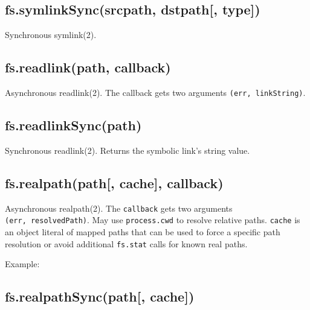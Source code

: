 \subsection{fs.symlinkSync(srcpath, dstpath{[},
type{]})}\label{fs.symlinksyncsrcpath-dstpath-type}

Synchronous symlink(2).

\subsection{fs.readlink(path, callback)}\label{fs.readlinkpath-callback}

Asynchronous readlink(2). The callback gets two arguments
\texttt{(err,\ linkString)}.

\subsection{fs.readlinkSync(path)}\label{fs.readlinksyncpath}

Synchronous readlink(2). Returns the symbolic link's string value.

\subsection{fs.realpath(path{[}, cache{]},
callback)}\label{fs.realpathpath-cache-callback}

Asynchronous realpath(2). The \texttt{callback} gets two arguments
\texttt{(err,\ resolvedPath)}. May use \texttt{process.cwd} to resolve
relative paths. \texttt{cache} is an object literal of mapped paths that
can be used to force a specific path resolution or avoid additional
\texttt{fs.stat} calls for known real paths.

Example:

\begin{Shaded}
\begin{Highlighting}[]
 \NormalTok{:}\NormalTok{\};}
\NormalTok{(} 
    
\NormalTok{\});}
\end{Highlighting}
\end{Shaded}

\subsection{fs.realpathSync(path{[},
cache{]})}\label{fs.realpathsyncpath-cache}

